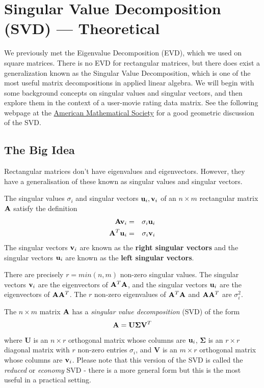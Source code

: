\section{Singular Value Decomposition (SVD) --- Theoretical}

We previously met the Eigenvalue Decomposition (EVD), which we used on square matrices. There is no EVD for rectangular matrices, but there does exist a generalization known as the Singular Value Decomposition, which is one of the most useful matrix decompositions in applied linear algebra. We will begin with some background concepts on singular values and singular vectors, and then explore them in the context of a user-movie rating data matrix. See the following webpage at the \href{http://www.ams.org/samplings/feature-column/fcarc-svd}{American Mathematical Society} for a good geometric discussion of the SVD.

\subsection{The Big Idea}

Rectangular matrices don't have eigenvalues and eigenvectors. However, they have a generalisation of these known as singular values and singular vectors. 

\bi
\item The singular values $\sigma_i$ and singular vectors $\mathbf{u}_i,\mathbf{v}_i$ of an $n \times m$ rectangular matrix $\mathbf{A}$ satisfy the definition
\begin{eqnarray}
\mathbf{A} \mathbf{v}_i &=& \sigma_i \mathbf{u}_i \label{righteq} \\
\mathbf{A}^T \mathbf{u}_i &=& \sigma_i \mathbf{v}_i \label{lefteq}
\end{eqnarray}
The singular vectors $\mathbf{v}_i$ are known as the \textbf{right singular vectors} and the singular vectors $\mathbf{u}_i$ are known as the \textbf{left singular vectors}. 

\item There are precisely $r=min(n,m)$ non-zero singular values. The singular vectors $\mathbf{v}_i$ are the eigenvectors of $\mathbf{A}^T \mathbf{A}$, and the singular vectors $\mathbf{u}_i$ are the eigenvectors of $\mathbf{A} \mathbf{A}^T$. The $r$ non-zero eigenvalues of $\mathbf{A}^T \mathbf{A}$ and $\mathbf{A} \mathbf{A}^T$ are $\sigma_i^2$.

\item The $n \times m$ matrix $\mathbf{A}$ has a \textit{singular value decomposition} (SVD) of the form
\begin{equation}
\mathbf{A} = \mathbf{U} \mathbf{\Sigma} \mathbf{V}^T
\label{svdeq}
\end{equation}
where $\mathbf{U}$ is an $n \times r$ orthogonal matrix whose columns are $\mathbf{u}_i$, $\mathbf{\Sigma}$ is an $r \times r$ diagonal matrix with $r$ non-zero entries $\sigma_i$, and $\mathbf{V}$ is an $m \times r$ orthogonal matrix whose columns are $\mathbf{v}_i$. Please note that this version of the SVD is called  the \textit{reduced} or \textit{economy} SVD - there is a more general form but this is the most useful in a practical setting.
\ei

